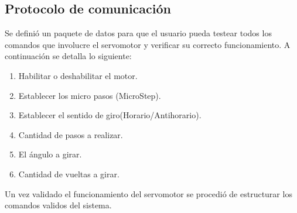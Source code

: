 \subsection{Protocolo de comunicación}
\label{subsec:Protocolo de comunicación}
Se definió un paquete de datos  para que el usuario pueda testear todos los comandos que involucre el servomotor y verificar su correcto funcionamiento. A continuación se detalla lo siguiente:
\begin{enumerate}
\item Habilitar o deshabilitar el motor.
\item Establecer los micro pasos (MicroStep).
\item Establecer el sentido de giro(Horario/Antihorario).
\item Cantidad de pasos a realizar.
\item El ángulo a girar.
\item Cantidad de vueltas a girar.
\end{enumerate}
Un vez validado el funcionamiento del servomotor se procedió de estructurar los comandos validos del sistema.
